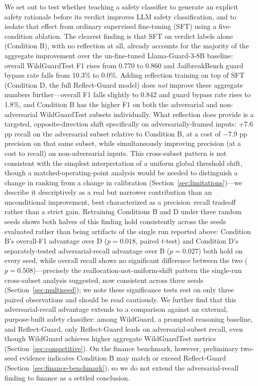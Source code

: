 \documentclass[superintelligence,article,submit,pdftex,moreauthors]{Definitions/mdpi}
\begin{document}
We set out to test whether teaching a safety classifier to generate an explicit safety rationale before its verdict improves LLM safety classification, and to isolate that effect from ordinary supervised fine-tuning (SFT) using a five-condition ablation. The clearest finding is that SFT on verdict labels alone (Condition B), with no reflection at all, already accounts for the majority of the aggregate improvement over the un-fine-tuned Llama-Guard-3-8B baseline: overall WildGuardTest F1 rises from 0.770 to 0.860 and JailbreakBench guard bypass rate falls from 10.3\% to 0.0\%. Adding reflection training on top of SFT (Condition D, the full Reflect-Guard model) does \emph{not} improve these aggregate numbers further---overall F1 falls slightly to 0.842 and guard bypass rate rises to 1.8\%, and Condition B has the higher F1 on both the adversarial and non-adversarial WildGuardTest subsets individually. What reflection does provide is a targeted, opposite-direction shift specifically on adversarially-framed inputs: +7.6 pp recall on the adversarial subset relative to Condition B, at a cost of $-$7.9 pp precision on that same subset, while simultaneously improving precision (at a cost to recall) on non-adversarial inputs. This cross-subset pattern is not consistent with the simplest interpretation of a uniform global threshold shift, though a matched-operating-point analysis would be needed to distinguish a change in ranking from a change in calibration (Section~\ref{sec:limitations})---we describe it descriptively as a real but narrower contribution than an unconditional improvement, best characterized as a precision--recall tradeoff rather than a strict gain. Retraining Conditions B and D under three random seeds shows both halves of this finding hold consistently across the seeds evaluated rather than being artifacts of the single run reported above: Condition B's overall-F1 advantage over D ($p=0.018$, paired $t$-test) and Condition D's separately-tested adversarial-recall advantage over B ($p=0.027$) both hold on every seed, while overall recall shows no significant difference between the two ($p=0.508$)---precisely the reallocation-not-uniform-shift pattern the single-run cross-subset analysis suggested, now consistent across three seeds (Section~\ref{sec:multiseed}); we note these significance tests rest on only three paired observations and should be read cautiously. We further find that this adversarial-recall advantage extends to a comparison against an external, purpose-built safety classifier: among WildGuard, a prompted reasoning baseline, and Reflect-Guard, only Reflect-Guard leads on adversarial-subset recall, even though WildGuard achieves higher aggregate WildGuardTest metrics (Section~\ref{sec:competitive}). On the finance benchmark, however, preliminary two-seed evidence indicates Condition B may match or exceed Reflect-Guard (Section~\ref{sec:finance-benchmark}), so we do not extend the adversarial-recall finding to finance as a settled conclusion.
\end{document}
